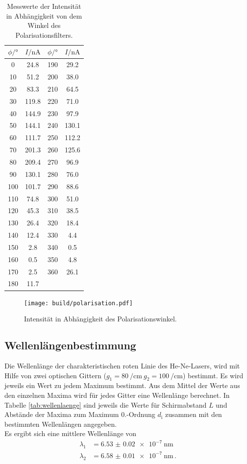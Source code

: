 \begin{table}
  \centering
  \caption{Messwerte der Intensität in Abhängigkeit von dem Winkel des Polarisationsfilters.}
  \label{tab:polarisation}
  \begin{tabular}{c c | c c}
\toprule
    $\phi / \si{\degree}$ & $I/\si{\nano\ampere}$ & $\phi / \si{\degree}$ & $I/\si{\nano\ampere}$\\
\midrule
0	&	24.8   & 190	&	29.2 \\
10	&	51.2 &  200	&	38.0  \\
20	&	83.3 &  210	&	64.5  \\
30	&	119.8&  220	&	71.0   \\
40	&	144.9&  230	&	97.9   \\
50	&	144.1&  240	&	130.1  \\
60	&	111.7&  250	&	112.2  \\
70	&	201.3&  260	&	125.6  \\
80	&	209.4& 270	&	96.9    \\
90	&	130.1& 280	&	76.0    \\
100	&	101.7& 290	&	88.6    \\
110	&	74.8 & 300	&	51.0   \\
120	&	45.3 & 310	&	38.5   \\
130	&	26.4 & 320	&	18.4   \\
140	&	12.4 & 330	&	4.4    \\
150	&	2.8  & 340	&	0.5   \\
160	&	0.5  & 350	&	4.8   \\
170	&	2.5  & 360	&	26.1  \\
180	&	11.7 &  &  \\
\bottomrule
\end{tabular}
\end{table}


\begin{figure}
  \centering
  \texttt{[image: build/polarisation.pdf]}
  \caption{Intensität in Abhängigkeit des Polarisationswinkel.}
  \label{fig:polarisation}
\end{figure}




\subsection{Wellenlängenbestimmung}
\label{subsec:wellenlaenge}

Die Wellenlänge der charakteristischen roten Linie des He-Ne-Lasers, wird mit Hilfe
von zwei optischen Gittern ($g_{1} = \SI{80}{\per\centi\meter} \ g_{2} = \SI{100}{\per\centi\meter}$) bestimmt.
Es wird jeweils ein Wert zu jedem Maximum bestimmt. Aus dem Mittel der Werte aus den einzelnen Maxima
wird für jedes Gitter eine Wellenlänge berechnet.
In Tabelle \ref{tab:wellenlaenge} sind jeweils die Werte für Schirmabstand $L$ und Abstände der Maxima
zum Maximum $0.$-Ordnung $d_{\text{i}}$ zusammen mit den bestimmten Wellenlängen angegeben.\\
Es ergibt sich eine mittlere Wellenlänge von
\begin{align*}
  \lambda_{1} &= \SI{6.53(2) e-7}{\nano\meter}\\
  \lambda_{2} &= \SI{6.58(1) e-7}{\nano\meter} \, .
\end{align*}


